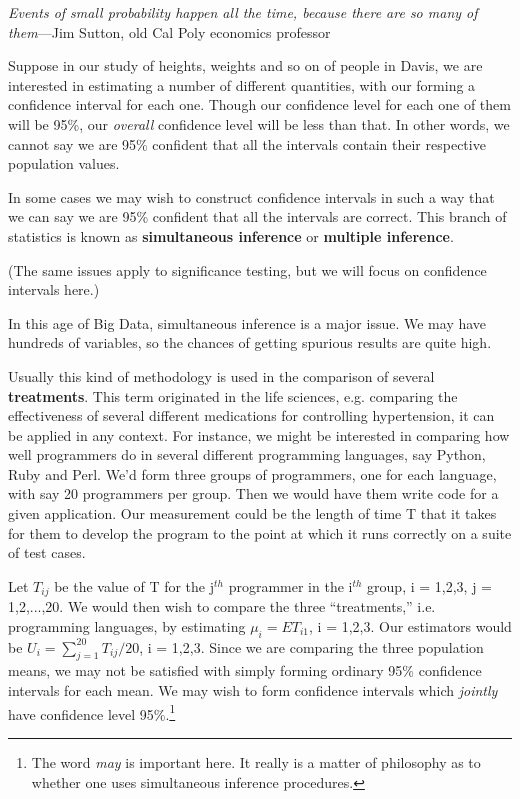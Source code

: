 {\it Events of small probability happen all the time, because there are
so many of them}---Jim Sutton, old Cal Poly economics professor

Suppose in our study of heights, weights and so on of people in Davis,
we are interested in estimating a number of different quantities, with
our forming a confidence interval for each one.  Though our confidence
level for each one of them will be 95\%, our {\it overall} confidence
level will be less than that.  In other words, we cannot say we are 95\%
confident that all the intervals contain their respective population
values.

In some cases we may wish to construct confidence intervals in such a
way that we can say we are 95\% confident that all the intervals are
correct.  This branch of statistics is known as {\bf simultaneous
inference} or {\bf multiple inference}.  

(The same issues apply to significance testing, but we will focus on
confidence intervals here.)

In this age of Big Data, simultaneous inference is a major issue.  We
may have hundreds of variables, so the chances of getting spurious
results are quite high.

Usually this kind of methodology is used in the comparison of several
{\bf treatments}.  This term originated in the life sciences, e.g.
comparing the effectiveness of several different medications for
controlling hypertension, it can be applied in any context.  For
instance, we might be interested in comparing how well programmers do in
several different programming languages, say Python, Ruby and Perl.
We'd form three groups of programmers, one for each language, with say
20 programmers per group.  Then we would have them write code for a
given application.  Our measurement could be the length of time T that
it takes for them to develop the program to the point at which it runs
correctly on a suite of test cases.  

Let $T_{ij}$ be the value of T for the j$^{th}$ programmer in the
i$^{th}$ group, i = 1,2,3, j = 1,2,...,20.  We would then wish to
compare the three ``treatments,'' i.e. programming languages, by
estimating $\mu_i = ET_{i1}$, i = 1,2,3.  Our estimators would be $U_i =
\sum_{j=1}^{20} T_{ij}/20$, i = 1,2,3.  Since we are comparing the three
population means, we may not be satisfied with simply forming ordinary
95\% confidence intervals for each mean.  We may wish to form confidence
intervals which {\it jointly} have confidence level 95\%.\footnote{The
word {\it may} is important here.  It really is a matter of philosophy
as to whether one uses simultaneous inference procedures.}

